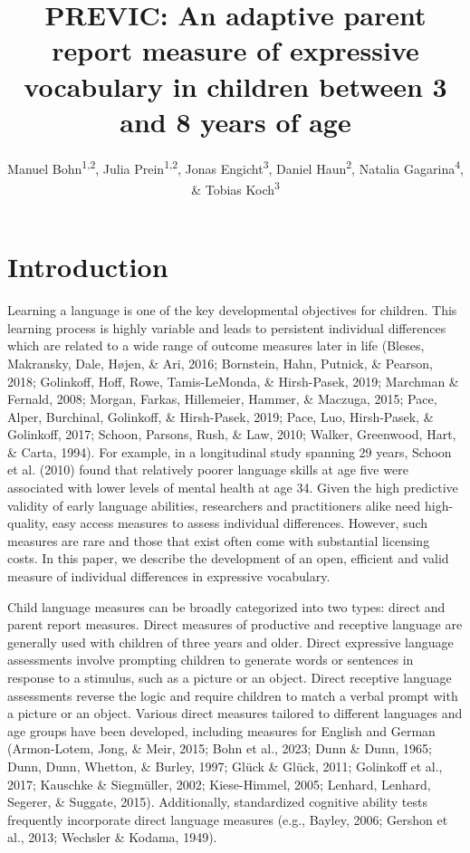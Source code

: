 \documentclass[
  man,floatsintext]{apa6}
\title{PREVIC: An adaptive parent report measure of expressive vocabulary in children between 3 and 8 years of age}
\author{Manuel Bohn\textsuperscript{1,2}, Julia Prein\textsuperscript{1,2}, Jonas Engicht\textsuperscript{3}, Daniel Haun\textsuperscript{2}, Natalia Gagarina\textsuperscript{4}, \& Tobias Koch\textsuperscript{3}}
\date{}
\affiliation{\vspace{0.5cm}\textsuperscript{1} Institute for Psychology, Leuphana University Lüneburg, Germany\\\textsuperscript{2} Department of Comparative Cultural Psychology, Max Planck Institute for Evolutionary Anthropology, Leipzig, Germany\\\textsuperscript{3} Institute of Psychology, Friedrich-Schiller-University Jena, Germany\\\textsuperscript{4} Leibniz-Zentrum Allgemeine Sprachwissenschaft, Berlin, Germany}
\begin{document}
\maketitle

\hypertarget{introduction}{%
\section{Introduction}\label{introduction}}

Learning a language is one of the key developmental objectives for children. This learning process is highly variable and leads to persistent individual differences which are related to a wide range of outcome measures later in life (Bleses, Makransky, Dale, Højen, \& Ari, 2016; Bornstein, Hahn, Putnick, \& Pearson, 2018; Golinkoff, Hoff, Rowe, Tamis-LeMonda, \& Hirsh-Pasek, 2019; Marchman \& Fernald, 2008; Morgan, Farkas, Hillemeier, Hammer, \& Maczuga, 2015; Pace, Alper, Burchinal, Golinkoff, \& Hirsh-Pasek, 2019; Pace, Luo, Hirsh-Pasek, \& Golinkoff, 2017; Schoon, Parsons, Rush, \& Law, 2010; Walker, Greenwood, Hart, \& Carta, 1994). For example, in a longitudinal study spanning 29 years, Schoon et al. (2010) found that relatively poorer language skills at age five were associated with lower levels of mental health at age 34. Given the high predictive validity of early language abilities, researchers and practitioners alike need high-quality, easy access measures to assess individual differences. However, such measures are rare and those that exist often come with substantial licensing costs. In this paper, we describe the development of an open, efficient and valid measure of individual differences in expressive vocabulary.

Child language measures can be broadly categorized into two types: direct and parent report measures. Direct measures of productive and receptive language are generally used with children of three years and older. Direct expressive language assessments involve prompting children to generate words or sentences in response to a stimulus, such as a picture or an object. Direct receptive language assessments reverse the logic and require children to match a verbal prompt with a picture or an object. Various direct measures tailored to different languages and age groups have been developed, including measures for English and German (Armon-Lotem, Jong, \& Meir, 2015; Bohn et al., 2023; Dunn \& Dunn, 1965; Dunn, Dunn, Whetton, \& Burley, 1997; Glück \& Glück, 2011; Golinkoff et al., 2017; Kauschke \& Siegmüller, 2002; Kiese-Himmel, 2005; Lenhard, Lenhard, Segerer, \& Suggate, 2015). Additionally, standardized cognitive ability tests frequently incorporate direct language measures (e.g., Bayley, 2006; Gershon et al., 2013; Wechsler \& Kodama, 1949).
\end{document}
